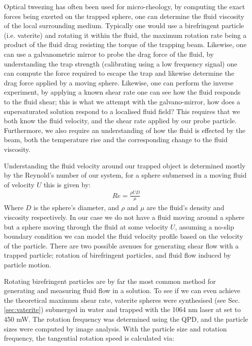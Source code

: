 \documentclass[a4paper,oneside,11pt]{book}
\begin{document}
Optical tweezing has often been used for micro-rheology, by computing the exact forces being exerted on the trapped sphere, one can determine the fluid viscosity of the local surrounding medium. Typically one would use a birefringent particle (i.e. vaterite) and rotating it within the fluid, the maximum rotation rate being a product of the fluid drag resisting the torque of the trapping beam. Likewise, one can use a galvanometric mirror to probe the drag force of the fluid, by understanding the trap strength (calibrating using a low frequency signal) one can compute the force required to escape the trap and likewise determine the drag force applied by a moving sphere. Likewise, one can perform the inverse experiment, by applying a known shear rate one can see how the fluid responds to the fluid shear; this is what we attempt with the galvano-mirror, how does a supersaturated solution respond to a localised fluid field? This requires that we both know the fluid velocity, and the shear rate applied by our probe particle. Furthermore, we also require an understanding of how the fluid is effected by the beam, both the temperature rise and the corresponding change to the fluid viscosity. 

Understanding the fluid velocity around our trapped object is determined mostly by the Reynold's number of our system, for a sphere submersed in a moving fluid of velocity $U$ this is given by:
\begin{align}
	Re = \frac{\rho UD}{\mu}
\end{align}
Where $D$ is the sphere's diameter, and $\rho$ and $\mu$ are the fluid's density and viscosity respectively. In our case we do not have a fluid moving around a sphere but a sphere moving through the fluid at some velocity $U$, assuming a no-slip boundary condition we can model the fluid velocity profile based on the velocity of the particle. There are two possible avenues for generating shear flow with a trapped particle; rotation of birefringent particles, and fluid flow induced by particle motion. 

Rotating birefringent particles are by far the most common method for generating and measuring fluid flow in a solution. To see if we can even achieve the theoretical maximum shear rate, vaterite spheres were synthesised (see Sec.\ref{sec:vaterite}) submerged in water and trapped with the 1064 nm laser at set to 450 mW. The rotation frequency was determined using the QPD, and the particle sizes were computed by image analysis. With the particle size and rotation frequency, the tangential rotation speed is calculated via:
\end{document}
